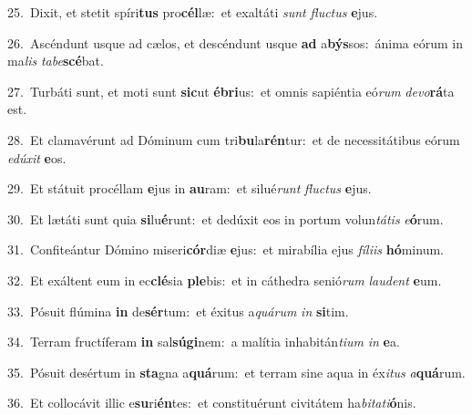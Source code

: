 {\numbfont\textcolor{\numbcolor}{25.}}~Dixit, et stetit spíri\textbf{tus} pro\-\textbf{cél}\-læ:~\star et exaltáti \textit{sunt} \textit{fluc}\-\textit{tus} \textbf{e}\-jus.\par
{\numbfont\textcolor{\numbcolor}{26.}}~Ascéndunt usque ad cælos, et descéndunt usque \textbf{ad} a\-\textbf{býs}\-sos:~\star ánima eórum in ma\textit{lis} \textit{ta}\-\textit{be}\textbf{scé}bat.\par
{\numbfont\textcolor{\numbcolor}{27.}}~Turbáti sunt, et moti sunt \textbf{sic}\-ut \textbf{é}\-\textbf{bri}us:~\star et omnis sapiéntia eó\textit{rum} \textit{de}\-\textit{vo}\textbf{rá}ta est.\par
{\numbfont\textcolor{\numbcolor}{28.}}~Et clamavérunt ad Dóminum cum tri\-\textbf{bu}\-la\-\textbf{rén}\-tur:~\star et de necessitátibus eórum \textit{e}\-\textit{dú}\textit{xit} \textbf{e}\-os.\par
{\numbfont\textcolor{\numbcolor}{29.}}~Et státuit procéllam \textbf{e}\-jus in \textbf{au}\-ram:~\star et silué\textit{runt} \textit{fluc}\-\textit{tus} \textbf{e}\-jus.\par
{\numbfont\textcolor{\numbcolor}{30.}}~Et lætáti sunt quia \textbf{si}\-lu\-\textbf{é}\-runt:~\star et dedúxit eos in portum volun\-\textit{tá}\-\textit{tis} \textit{e}\-\textbf{ó}rum.\par
{\numbfont\textcolor{\numbcolor}{31.}}~Confiteántur Dómino miseri\-\textbf{cór}\-diæ \textbf{e}\-jus:~\star et mirabília ejus \textit{fí}\-\textit{li}\textit{is} \textbf{hó}\-minum.\par
{\numbfont\textcolor{\numbcolor}{32.}}~Et exáltent eum in ec\-\textbf{clé}\-sia \textbf{ple}\-bis:~\star et in cáthedra senió\textit{rum} \textit{lau}\-\textit{dent} \textbf{e}\-um.\par
{\numbfont\textcolor{\numbcolor}{33.}}~Pósuit flúmina \textbf{in} de\-\textbf{sér}\-tum:~\star et éxitus a\-\textit{quá}\-\textit{rum} \textit{in} \textbf{si}\-tim.\par
{\numbfont\textcolor{\numbcolor}{34.}}~Terram fructíferam \textbf{in} sal\-\textbf{sú}\-\textbf{gi}nem:~\star a malítia inhabitán\-\textit{ti}\-\textit{um} \textit{in} \textbf{e}\-a.\par
{\numbfont\textcolor{\numbcolor}{35.}}~Pósuit desértum in \textbf{sta}\-gna a\-\textbf{quá}\-rum:~\star et terram sine aqua in éx\-\textit{i}\-\textit{tus} \textit{a}\-\textbf{quá}rum.\par
{\numbfont\textcolor{\numbcolor}{36.}}~Et collocávit illic e\-\textbf{su}\-ri\-\textbf{én}\-tes:~\star et constituérunt civitátem ha\-\textit{bi}\-\textit{ta}\textit{ti}\textbf{ó}nis.\par
